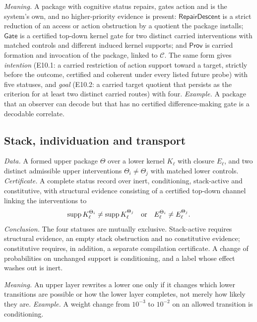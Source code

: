 \emph{Meaning.} A package with cognitive status repairs, gates action and is the system's own, and
no higher-priority evidence is present: $\mathsf{RepairDescent}$ is a strict reduction of an access or action
obstruction by a quotient the package installs; $\mathsf{Gate}$ is a certified top-down kernel gate
for two distinct carried interventions with matched controls and different induced kernel supports;
and $\mathsf{Prov}$ is carried formation and invocation of the package, linked to $\mathcal C$. The
same form gives \emph{intention} (E10.1: a carried restriction of action support toward a target,
strictly before the outcome, certified and coherent under every listed future probe) with five
statuses, and \emph{goal} (E10.2: a carried target quotient that persists as the criterion for at
least two distinct carried routes) with four.
\emph{Example.} A package that an observer can decode but that has no certified difference-making
gate is a decodable correlate.

\subsection{Stack, individuation and transport}\label{sec:tmpl-stack}

\begin{schema}\label{tmpl:e11}
\emph{Data.} A formed upper package $\Theta$ over a lower kernel $K_\ell$ with closure $E_\ell$, and two
distinct admissible upper interventions $\Theta_i \ne \Theta_j$ with matched lower controls.
\emph{Certificate.} A complete status record over inert, conditioning, stack-active and constitutive,
with structural evidence consisting of a certified top-down channel linking the interventions to
\[
  \operatorname{supp} K_\ell^{\Theta_i} \ne \operatorname{supp} K_\ell^{\Theta_j}
  \quad\text{or}\quad
  E_\ell^{\Theta_i} \ne E_\ell^{\Theta_j}.
\]
\emph{Conclusion.} The four statuses are mutually exclusive. Stack-active requires structural
evidence, an empty stack obstruction and no constitutive evidence; constitutive requires, in
addition, a separate compilation certificate. A change of probabilities on unchanged support is
conditioning, and a label whose effect washes out is inert.
\end{schema}

\emph{Meaning.} An upper layer rewrites a lower one only if it changes which lower transitions are
possible or how the lower layer completes, not merely how likely they are.
\emph{Example.} A weight change from $10^{-3}$ to $10^{-2}$ on an allowed transition is conditioning.

